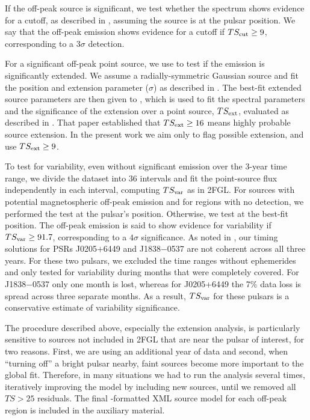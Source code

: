 If the off-peak source is significant, we test whether
the spectrum shows evidence for a cutoff, as described in
\citet{ackermann_2011a_fermi-lat-search}, assuming the source is at the
pulsar position.  We say that the off-peak emission shows evidence for
a cutoff if $TS_{\rm cut}\geq9$, corresponding to a $3\sigma$ detection.

For a significant off-peak point source, we use \pointlike to test if the
emission is significantly extended.  We assume a radially-symmetric
Gaussian source and fit the position and extension parameter
($\sigma$) as described in \citet{lande_2012_search-spatially}.
The best-fit extended source parameters are then given to \gtlike,
which is used to fit the spectral parameters and the significance of the
extension over a point source, $TS_{\rm ext}$, evaluated as described in
\citet{lande_2012_search-spatially}.  That paper established that $TS_{\rm
ext}\geq16$ means highly probable source extension.  In the present work
we aim only to flag possible extension, and use  $TS_{\rm ext}\geq9$.

To test for variability, even without significant emission over the
3-year time range, we divide the dataset into 36 intervals and fit the
point-source flux independently in each interval, computing $TS_{\rm
var}$ as in 2FGL.  For sources with potential magnetospheric off-peak
emission and for regions with no detection, we performed the test at
the pulsar's position.  Otherwise, we test at the best-fit position.
The off-peak emission is said to show evidence for variability if
$TS_{\rm var}\geq91.7$, corresponding to a $4\sigma$ significance.  %
As noted in \citep{abdo_2013a_second-fermi}, our timing solutions for
PSRs J0205+6449 and J1838$-$0537 are not coherent across all three years.
For these two pulsars, we excluded the time ranges without ephemerides and
only tested for variability during months that were completely covered.
For J1838$-$0537 only one month is lost, whereas for J0205+6449 the 7\%
data loss is spread across three separate months.  As a result, $TS_{\rm
var}$ for these pulsars is a conservative estimate of variability
significance.

The procedure described above, especially the extension analysis, is
particularly sensitive to sources not included in 2FGL that are near the
pulsar of interest, for two reasons.  First, we are using an additional
year of data and second, when ``turning off'' a bright pulsar nearby,
faint sources become more important to the global fit.  Therefore, in
many situations we had to run the analysis several times, iteratively
improving the model by including new sources, until we removed all $TS>25$
residuals. The final \gtlike-formatted XML source model for each off-peak
region is included in the auxiliary material.

